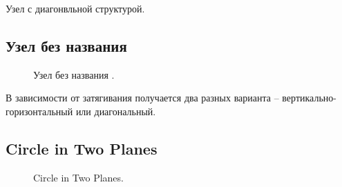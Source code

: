 Узел с диагонвльной структурой.

\addtocounter{KnotNoName}{1}

\subsection{Узел без названия }

\begin{figure}[H]\centering
	\begin{minipage}{1\linewidth}
		\begin{center}
			\tcbox[enhanced jigsaw,colframe=black,opacityframe=0.5,opacityback=0.5]
			{\centering{}}
		\end{center}
	\end{minipage}
\caption{Узел без названия .}
\label{ris:KnotNoName_15}
\end{figure}

В зависимости от затягивания получается два разных варианта – вертикально-горизонтальный или диагональный.

\subsection{Circle in Two Planes}

\begin{figure}[H]\centering
	\begin{minipage}{1\linewidth}
		\begin{center}
			\tcbox[enhanced jigsaw,colframe=black,opacityframe=0.5,opacityback=0.5]
			{\centering{}}
		\end{center}
	\end{minipage}
\caption{Circle in Two Planes.}
\label{ris:Circle_Two_Planes}
\end{figure}
